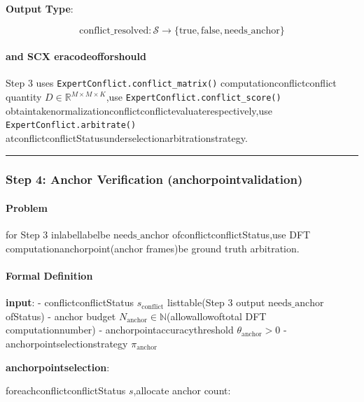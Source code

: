 \documentclass[
  12pt,
]{article}
\begin{document}
\textbf{Output Type}:

\[\text{conflict\_resolved}: \mathcal{S} \to \{\text{true}, \text{false}, \text{needs\_anchor}\}\]

\paragraph{and SCX
eracodeofforshould}\label{ux4e0e-scx-ux4ee3ux7801ux7684ux5bf9ux5e94-1}

Step 3 uses \texttt{ExpertConflict.conflict\_matrix()} computationconflictconflict quantity
\(D \in \mathbb{R}^{M \times M \times K}\),use
\texttt{ExpertConflict.conflict\_score()} obtaintakenormalizationconflictconflictevaluaterespectively,use
\texttt{ExpertConflict.arbitrate()} atconflictconflictStatusunderselectionarbitrationstrategy.

\begin{center}\rule{0.5\linewidth}{0.5pt}\end{center}

\subsubsection{Step 4: Anchor Verification
(anchorpointvalidation)}\label{step-4-anchor-verification-ux951aux70b9ux9a8cux8bc1}

\paragraph{Problem}\label{ux95eeux9898-3}

for Step 3 inlabellabelbe \(\text{needs\_anchor}\) ofconflictconflictStatus,use DFT
computationanchorpoint(anchor frames)be ground truth arbitration.

\paragraph{Formal Definition}\label{ux5f62ux5f0fux5316ux5b9aux4e49-3}

\textbf{input}: - conflictconflictStatus \(s_{\text{conflict}}\) listtable(Step 3 output
\(\text{needs\_anchor}\) ofStatus) - anchor budget
\(N_{\text{anchor}} \in \mathbb{N}\)(allowallowoftotal DFT computationnumber) -
anchorpointaccuracythreshold \(\theta_{\text{anchor}} > 0\) - anchorpointselectionstrategy
\(\pi_{\text{anchor}}\)

\textbf{anchorpointselection}:

foreachconflictconflictStatus \(s\),allocate anchor count:
\end{document}
